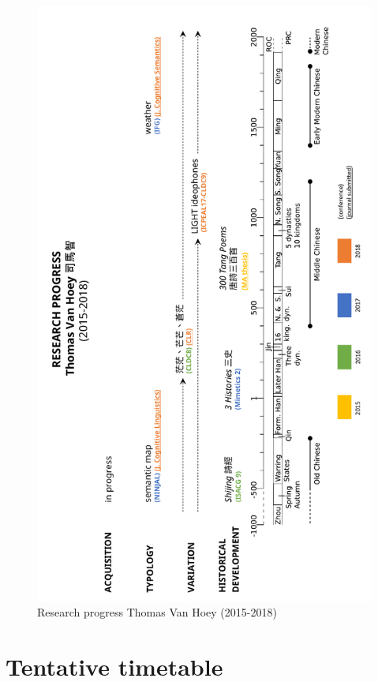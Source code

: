 \documentclass[12pt,]{article}
\theoremstyle{definition}
\theoremstyle{definition}
\theoremstyle{definition}
\theoremstyle{remark}
\begin{document}
\begin{figure}

{\centering \includegraphics[width=6.5in]{progress} 

}

\caption{Research progress Thomas Van Hoey (2015-2018)}\label{fig:progress}
\end{figure}

\section{Tentative timetable}\label{tentative-timetable}
\end{document}
